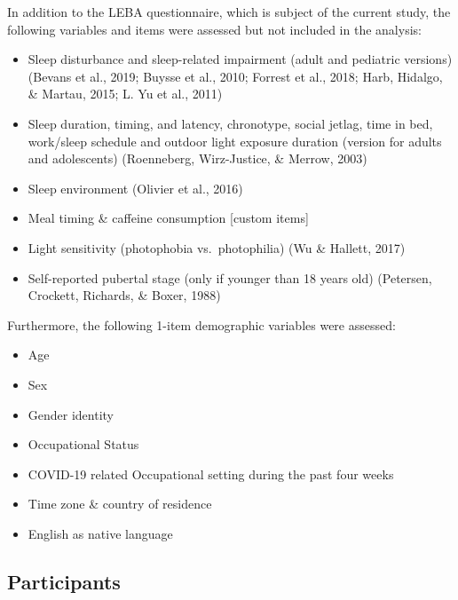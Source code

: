 \documentclass[
  english,
  man]{apa6}
\providecommand{\tightlist}{%
  \setlength{\itemsep}{0pt}\setlength{\parskip}{0pt}}
\begin{document}
In addition to the LEBA questionnaire, which is subject of the current study, the following variables and items were assessed but not included in the analysis:

\begin{itemize}
\tightlist
\item
  Sleep disturbance and sleep-related impairment (adult and pediatric versions) (Bevans et al., 2019; Buysse et al., 2010; Forrest et al., 2018; Harb, Hidalgo, \& Martau, 2015; L. Yu et al., 2011)
\item
  Sleep duration, timing, and latency, chronotype, social jetlag, time in bed, work/sleep schedule and outdoor light exposure duration (version for adults and adolescents) (Roenneberg, Wirz-Justice, \& Merrow, 2003)
\item
  Sleep environment (Olivier et al., 2016)
\item
  Meal timing \& caffeine consumption {[}custom items{]}
\item
  Light sensitivity (photophobia vs.~photophilia) (Wu \& Hallett, 2017)
\item
  Self-reported pubertal stage (only if younger than 18 years old) (Petersen, Crockett, Richards, \& Boxer, 1988)
\end{itemize}

Furthermore, the following 1-item demographic variables were assessed:

\begin{itemize}
\tightlist
\item
  Age
\item
  Sex
\item
  Gender identity
\item
  Occupational Status
\item
  COVID-19 related Occupational setting during the past four weeks
\item
  Time zone \& country of residence
\item
  English as native language
\end{itemize}

\hypertarget{participants}{%
\subsection{Participants}\label{participants}}
\end{document}
